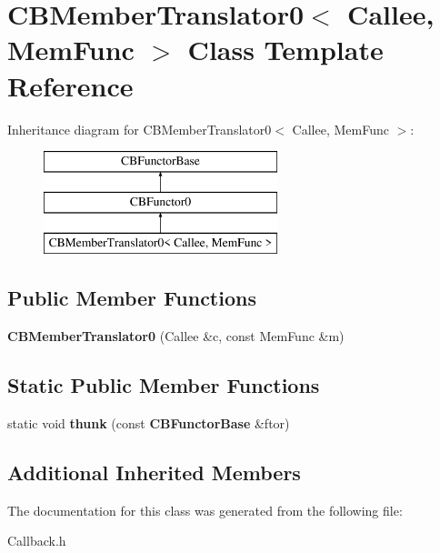 \section{C\+B\+Member\+Translator0$<$ Callee, Mem\+Func $>$ Class Template Reference}
\label{classCBMemberTranslator0}
Inheritance diagram for C\+B\+Member\+Translator0$<$ Callee, Mem\+Func $>$\+:\begin{figure}[H]
\begin{center}
\leavevmode
\includegraphics[height=3.000000cm]{classCBMemberTranslator0}
\end{center}
\end{figure}
\subsection*{Public Member Functions}
\begin{DoxyCompactItemize}
\item 
{\bfseries C\+B\+Member\+Translator0} (Callee \&c, const Mem\+Func \&m)\label{classCBMemberTranslator0_af242b8ca6be0ecabc13c0c9b8ae4a855}

\end{DoxyCompactItemize}
\subsection*{Static Public Member Functions}
\begin{DoxyCompactItemize}
\item 
static void {\bfseries thunk} (const {\bf C\+B\+Functor\+Base} \&ftor)\label{classCBMemberTranslator0_a0c48ec67cc966a40be1b0c47979f5cb5}

\end{DoxyCompactItemize}
\subsection*{Additional Inherited Members}


The documentation for this class was generated from the following file\+:\begin{DoxyCompactItemize}
\item 
Callback.\+h\end{DoxyCompactItemize}
